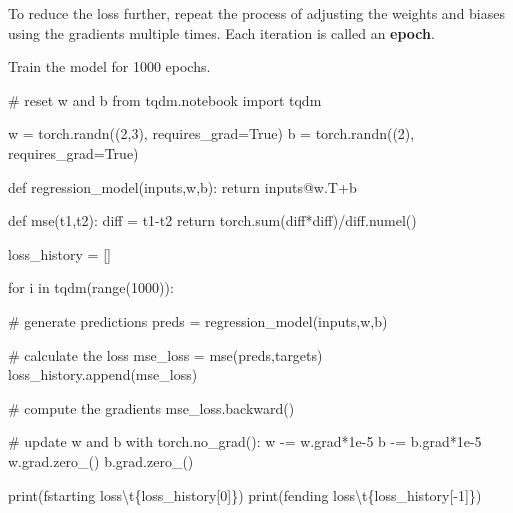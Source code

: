 \documentclass[
  letterpaper,
  DIV=11,
  numbers=noendperiod]{scrartcl}
\newenvironment{Shaded}{\begin{snugshade}}{\end{snugshade}}
\newcommand{\BuiltInTok}[1]{\textcolor[rgb]{0.00,0.23,0.31}{#1}}
\newcommand{\CharTok}[1]{\textcolor[rgb]{0.13,0.47,0.30}{#1}}
\newcommand{\CommentTok}[1]{\textcolor[rgb]{0.37,0.37,0.37}{#1}}
\newcommand{\ControlFlowTok}[1]{\textcolor[rgb]{0.00,0.23,0.31}{#1}}
\newcommand{\DecValTok}[1]{\textcolor[rgb]{0.68,0.00,0.00}{#1}}
\newcommand{\FloatTok}[1]{\textcolor[rgb]{0.68,0.00,0.00}{#1}}
\newcommand{\ImportTok}[1]{\textcolor[rgb]{0.00,0.46,0.62}{#1}}
\newcommand{\KeywordTok}[1]{\textcolor[rgb]{0.00,0.23,0.31}{#1}}
\newcommand{\NormalTok}[1]{\textcolor[rgb]{0.00,0.23,0.31}{#1}}
\newcommand{\OperatorTok}[1]{\textcolor[rgb]{0.37,0.37,0.37}{#1}}
\newcommand{\SpecialCharTok}[1]{\textcolor[rgb]{0.37,0.37,0.37}{#1}}
\newcommand{\SpecialStringTok}[1]{\textcolor[rgb]{0.13,0.47,0.30}{#1}}
\newcommand{\VariableTok}[1]{\textcolor[rgb]{0.07,0.07,0.07}{#1}}
\begin{document}
To reduce the loss further, repeat the process of adjusting the weights
and biases using the gradients multiple times. Each iteration is called
an \textbf{epoch}.

Train the model for 1000 epochs.

\begin{Shaded}
\begin{Highlighting}[]
\CommentTok{\# reset w and b}
\ImportTok{from}\NormalTok{ tqdm.notebook }\ImportTok{import}\NormalTok{ tqdm}


\NormalTok{w }\OperatorTok{=}\NormalTok{ torch.randn((}\DecValTok{2}\NormalTok{,}\DecValTok{3}\NormalTok{), requires\_grad}\OperatorTok{=}\VariableTok{True}\NormalTok{)}
\NormalTok{b }\OperatorTok{=}\NormalTok{ torch.randn((}\DecValTok{2}\NormalTok{), requires\_grad}\OperatorTok{=}\VariableTok{True}\NormalTok{)}

\KeywordTok{def}\NormalTok{ regression\_model(inputs,w,b):}
    \ControlFlowTok{return}\NormalTok{ inputs}\OperatorTok{@}\NormalTok{w.T}\OperatorTok{+}\NormalTok{b}

\KeywordTok{def}\NormalTok{ mse(t1,t2):}
\NormalTok{    diff }\OperatorTok{=}\NormalTok{ t1}\OperatorTok{{-}}\NormalTok{t2}
    \ControlFlowTok{return}\NormalTok{ torch.}\BuiltInTok{sum}\NormalTok{(diff}\OperatorTok{*}\NormalTok{diff)}\OperatorTok{/}\NormalTok{diff.numel()}

\NormalTok{loss\_history }\OperatorTok{=}\NormalTok{ []}

\ControlFlowTok{for}\NormalTok{ i }\KeywordTok{in}\NormalTok{ tqdm(}\BuiltInTok{range}\NormalTok{(}\DecValTok{1000}\NormalTok{)):}

    \CommentTok{\# generate predictions}
\NormalTok{    preds }\OperatorTok{=}\NormalTok{ regression\_model(inputs,w,b)}
    
    \CommentTok{\# calculate the loss}
\NormalTok{    mse\_loss }\OperatorTok{=}\NormalTok{ mse(preds,targets)}
\NormalTok{    loss\_history.append(mse\_loss)}

    \CommentTok{\# compute the gradients}
\NormalTok{    mse\_loss.backward()}

    \CommentTok{\# update w and b}
    \ControlFlowTok{with}\NormalTok{ torch.no\_grad():}
\NormalTok{        w }\OperatorTok{{-}=}\NormalTok{ w.grad}\OperatorTok{*}\FloatTok{1e{-}5}
\NormalTok{        b }\OperatorTok{{-}=}\NormalTok{ b.grad}\OperatorTok{*}\FloatTok{1e{-}5}
\NormalTok{        w.grad.zero\_()}
\NormalTok{        b.grad.zero\_()}

\BuiltInTok{print}\NormalTok{(}\SpecialStringTok{f\textquotesingle{}starting loss}\CharTok{\textbackslash{}t}\SpecialCharTok{\{}\NormalTok{loss\_history[}\DecValTok{0}\NormalTok{]}\SpecialCharTok{\}}\SpecialStringTok{\textquotesingle{}}\NormalTok{)}
\BuiltInTok{print}\NormalTok{(}\SpecialStringTok{f\textquotesingle{}ending loss}\CharTok{\textbackslash{}t}\SpecialCharTok{\{}\NormalTok{loss\_history[}\OperatorTok{{-}}\DecValTok{1}\NormalTok{]}\SpecialCharTok{\}}\SpecialStringTok{\textquotesingle{}}\NormalTok{)}
\end{Highlighting}
\end{Shaded}
\end{document}
